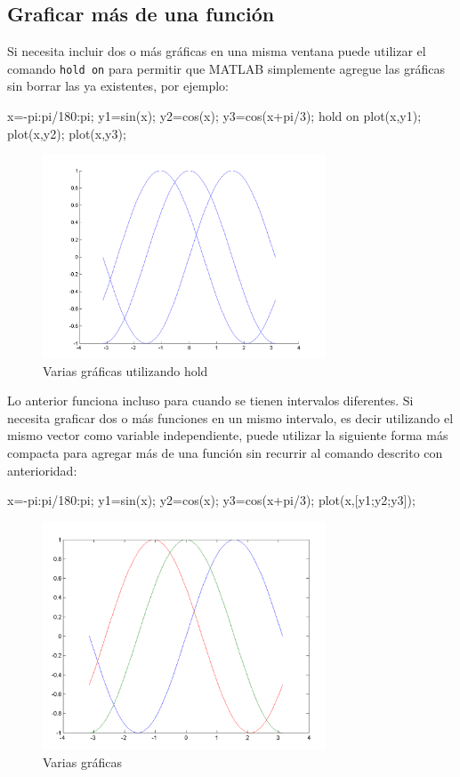 \subsection{Graficar más de una función}

Si necesita incluir dos o más gráficas en una misma ventana puede
utilizar el comando \texttt{hold\ on} para permitir que MATLAB
simplemente agregue las gráficas sin borrar las ya existentes, por
ejemplo:

\begin{matlab}
x=-pi:pi/180:pi;
y1=sin(x);
y2=cos(x);
y3=cos(x+pi/3);
hold on
plot(x,y1);
plot(x,y2);
plot(x,y3);
\end{matlab}

\begin{figure}[htbp]
    \centering
    \includegraphics[width=0.75\textwidth]{images/ch4/img_4_2.png}
    \caption{Varias gráficas utilizando hold}
    \label{fig:img_4_2}
\end{figure}

Lo anterior funciona incluso para cuando se tienen intervalos
diferentes. Si necesita graficar dos o más funciones en un mismo
intervalo, es decir utilizando el mismo vector como variable
independiente, puede utilizar la siguiente forma más compacta para
agregar más de una función sin recurrir al comando descrito con
anterioridad:

\begin{matlab}
x=-pi:pi/180:pi;
y1=sin(x);
y2=cos(x);
y3=cos(x+pi/3);
plot(x,[y1;y2;y3]);
\end{matlab}

\begin{figure}[htbp]
    \centering
    \includegraphics[width=0.75\textwidth]{images/ch4/img_4_3.png}
    \caption{Varias gráficas}
    \label{fig:img_4_3}
\end{figure}

